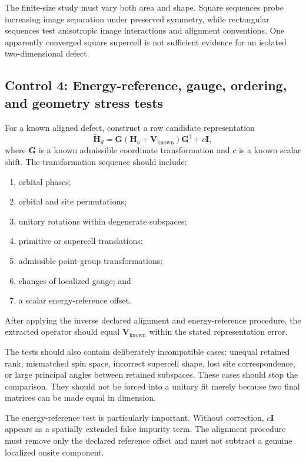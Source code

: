 The finite-size study must vary both area and shape. Square sequences probe
increasing image separation under preserved symmetry, while rectangular
sequences test anisotropic image interactions and alignment conventions. One
apparently converged square supercell is not sufficient evidence for an
isolated two-dimensional defect.

\subsection*{Control 4: Energy-reference, gauge, ordering, and geometry stress tests}

For a known aligned defect, construct a raw candidate representation
\begin{equation}
    \widetilde{\mathbf H}_{d}
    =
    \mathbf G
    \left(
        \mathbf H_b+\mathbf V_{\mathrm{known}}
    \right)
    \mathbf G^\dagger
    +
    c\mathbf I,
\end{equation}
where $\mathbf G$ is a known admissible coordinate transformation and $c$ is a
known scalar shift. The transformation sequence should include:
\begin{enumerate}
    \item orbital phases;
    \item orbital and site permutations;
    \item unitary rotations within degenerate subspaces;
    \item primitive or supercell translations;
    \item admissible point-group transformations;
    \item changes of localized gauge; and
    \item a scalar energy-reference offset.
\end{enumerate}
After applying the inverse declared alignment and energy-reference procedure,
the extracted operator should equal $\mathbf V_{\mathrm{known}}$ within the
stated representation error.

The tests should also contain deliberately incompatible cases: unequal retained
rank, mismatched spin space, incorrect supercell shape, lost site
correspondence, or large principal angles between retained subspaces. These
cases should stop the comparison. They should not be forced into a unitary fit
merely because two final matrices can be made equal in dimension.

The energy-reference test is particularly important. Without correction,
$c\mathbf I$ appears as a spatially extended false impurity term. The alignment
procedure must remove only the declared reference offset and must not subtract
a genuine localized onsite component.

